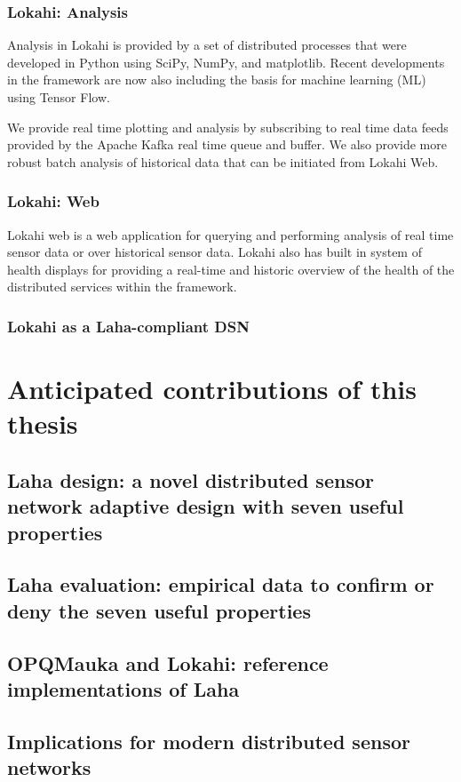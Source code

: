 \subsubsection{Lokahi: Analysis}
Analysis in Lokahi is provided by a set of distributed processes that were developed in Python using SciPy, NumPy, and matplotlib. Recent developments in the framework are now also including the basis for machine learning (ML) using Tensor Flow.

We provide real time plotting and analysis by subscribing to real time data feeds provided by the Apache Kafka real time queue and buffer. We also provide more robust batch analysis of historical data that can be initiated from Lokahi Web.


\subsubsection{Lokahi: Web}
Lokahi web is a web application for querying and performing analysis of real time sensor data or over historical sensor data. Lokahi also has built in system of health displays for providing a real-time and historic overview of the health of the distributed services within the framework. 


\subsubsection{Lokahi as a Laha-compliant DSN}

\section{Anticipated contributions of this thesis}
\subsection{Laha design: a novel distributed sensor network adaptive design with seven useful properties}
\subsection{Laha evaluation: empirical data to confirm or deny the seven useful properties}
\subsection{OPQMauka and Lokahi: reference implementations of Laha}
\subsection{Implications for modern distributed sensor networks}

